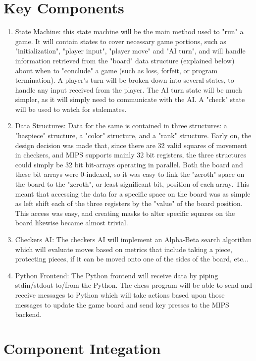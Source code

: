 \documentclass[]{article}
\begin{document}
\section*{Key Components}
\begin{enumerate}
\item State Machine: this state machine will be the main method used to "run" a game. It will contain states to cover necessary game portions, such as "initialization", "player input", "player move" and "AI turn", and will handle information retrieved from the "board" data structure (explained below) about when to "conclude" a game (such as loss, forfeit, or program termination). A player's turn will be broken down into several states, to handle any input received from the player. The AI turn state will be much simpler, as it will simply need to communicate with the AI. A "check" state will be used to watch for stalemates.

\item Data Structures: Data for the same is contained in three structures: a "haspiece" structure, a "color" structure, and a "rank" structure. Early on, the design decision was made that, since there are 32 valid squares of movement in checkers, and MIPS supports mainly 32 bit registers, the three structures could simply be 32 bit bit-arrays operating in parallel. Both the board and these bit arrays were 0-indexed, so it was easy to link the "zeroth" space on the board to the "zeroth", or least significant bit, position of each array. This meant that accessing the data for a specific space on the board was as simple as left shift each of the three registers by the "value" of the board position. This access was easy, and creating masks to alter specific squares on the board likewise became almost trivial.

\item Checkers AI: The checkers AI will implement an Alpha-Beta search algorithm which will evaluate
moves based on metrics that include taking a piece, protecting pieces, if it can be moved onto one
of the sides of the board, etc...
 
\item Python Frontend: The Python frontend will receive data by piping stdin/stdout to/from the Python.
The chess program will be able to send and receive messages to Python which will take actions based upon
those messages to update the game board and send key presses to the MIPS backend.
\end{enumerate}

\section*{Component Integation}
\end{document}
